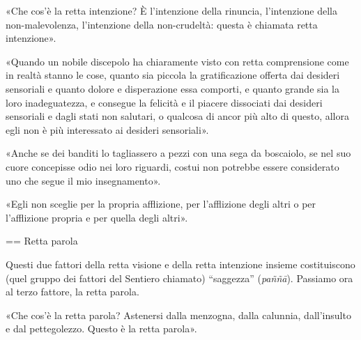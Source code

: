  «Che cos’è la retta intenzione? È l’intenzione della
rinuncia, l’intenzione della non-malevolenza, l’intenzione della
non-crudeltà: questa è chiamata retta intenzione».




«Quando un nobile discepolo ha chiaramente visto con retta comprensione
come in realtà stanno le cose, quanto sia piccola la gratificazione
offerta dai desideri sensoriali e quanto dolore e disperazione essa
comporti, e quanto grande sia la loro inadeguatezza, e consegue la
felicità e il piacere dissociati dai desideri sensoriali e dagli stati
non salutari, o qualcosa di ancor più alto di questo, allora egli non è
più interessato ai desideri sensoriali».




«Anche se dei banditi lo tagliassero a pezzi con una sega da boscaiolo,
se nel suo cuore concepisse odio nei loro riguardi, costui non potrebbe
essere considerato uno che segue il mio insegnamento».




«Egli non sceglie per la propria afflizione, per l’afflizione degli
altri o per l’afflizione propria e per quella degli altri».




\label{pag265}
== Retta parola


 Questi due fattori della retta visione e della retta
intenzione insieme costituiscono (quel gruppo dei fattori del Sentiero
chiamato) “saggezza” (\emph{paññā}). Passiamo ora al terzo fattore, la retta
parola.


 «Che cos’è la retta parola? Astenersi dalla menzogna, dalla
calunnia, dall’insulto e dal pettegolezzo. Questo è la retta parola».




